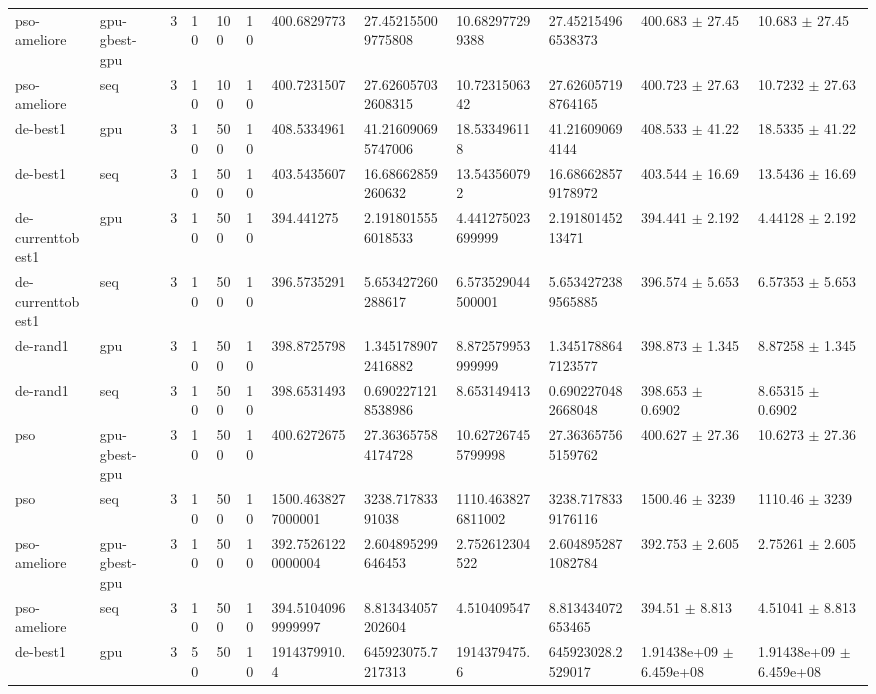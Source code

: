 \begin{table}[t]
\begin{tabular}{llllllllllll}
pso-ameliore & gpu-gbest-gpu & 3 & 10 & 100 & 10 & 400.6829773 & 27.452155009775808 & 10.682977299388 & 27.452154966538373 & 400.683 $\pm$ 27.45 & 10.683 $\pm$ 27.45 \\
pso-ameliore & seq & 3 & 10 & 100 & 10 & 400.7231507 & 27.626057032608315 & 10.7231506342 & 27.626057198764165 & 400.723 $\pm$ 27.63 & 10.7232 $\pm$ 27.63 \\
de-best1 & gpu & 3 & 10 & 500 & 10 & 408.5334961 & 41.216090695747006 & 18.533496118 & 41.216090694144 & 408.533 $\pm$ 41.22 & 18.5335 $\pm$ 41.22 \\
de-best1 & seq & 3 & 10 & 500 & 10 & 403.5435607 & 16.68662859260632 & 13.543560792 & 16.686628579178972 & 403.544 $\pm$ 16.69 & 13.5436 $\pm$ 16.69 \\
de-currenttobest1 & gpu & 3 & 10 & 500 & 10 & 394.441275 & 2.1918015556018533 & 4.441275023699999 & 2.19180145213471 & 394.441 $\pm$ 2.192 & 4.44128 $\pm$ 2.192 \\
de-currenttobest1 & seq & 3 & 10 & 500 & 10 & 396.5735291 & 5.653427260288617 & 6.573529044500001 & 5.6534272389565885 & 396.574 $\pm$ 5.653 & 6.57353 $\pm$ 5.653 \\
de-rand1 & gpu & 3 & 10 & 500 & 10 & 398.8725798 & 1.3451789072416882 & 8.872579953999999 & 1.3451788647123577 & 398.873 $\pm$ 1.345 & 8.87258 $\pm$ 1.345 \\
de-rand1 & seq & 3 & 10 & 500 & 10 & 398.6531493 & 0.6902271218538986 & 8.653149413 & 0.6902270482668048 & 398.653 $\pm$ 0.6902 & 8.65315 $\pm$ 0.6902 \\
pso & gpu-gbest-gpu & 3 & 10 & 500 & 10 & 400.6272675 & 27.363657584174728 & 10.627267455799998 & 27.363657565159762 & 400.627 $\pm$ 27.36 & 10.6273 $\pm$ 27.36 \\
pso & seq & 3 & 10 & 500 & 10 & 1500.4638277000001 & 3238.71783391038 & 1110.4638276811002 & 3238.7178339176116 & 1500.46 $\pm$ 3239 & 1110.46 $\pm$ 3239 \\
pso-ameliore & gpu-gbest-gpu & 3 & 10 & 500 & 10 & 392.75261220000004 & 2.604895299646453 & 2.752612304522 & 2.6048952871082784 & 392.753 $\pm$ 2.605 & 2.75261 $\pm$ 2.605 \\
pso-ameliore & seq & 3 & 10 & 500 & 10 & 394.51040969999997 & 8.813434057202604 & 4.510409547 & 8.813434072653465 & 394.51 $\pm$ 8.813 & 4.51041 $\pm$ 8.813 \\
de-best1 & gpu & 3 & 50 & 50 & 10 & 1914379910.4 & 645923075.7217313 & 1914379475.6 & 645923028.2529017 & 1.91438e+09 $\pm$ 6.459e+08 & 1.91438e+09 $\pm$ 6.459e+08 \\

\end{tabular}
\end{table}
